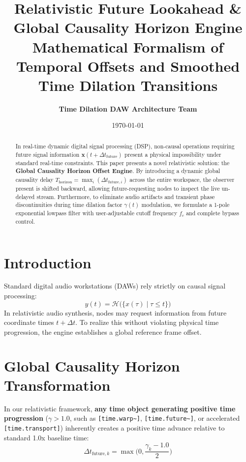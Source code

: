 \documentclass[11pt,a4paper]{article}
\title{\textbf{Relativistic Future Lookahead \& Global Causality Horizon Engine}\\[0.5em]
\large Mathematical Formalism of Temporal Offsets and Smoothed Time Dilation Transitions}
\author{\textbf{Time Dilation DAW Architecture Team}}
\date{\today}
\begin{document}
\maketitle

\begin{abstract}
In real-time dynamic digital signal processing (DSP), non-causal operations requiring future signal information $\mathbf{x}(t + \Delta t_{\text{future}})$ present a physical impossibility under standard real-time constraints. This paper presents a novel relativistic solution: the \textbf{Global Causality Horizon Offset Engine}. By introducing a dynamic global causality delay $T_{\text{horizon}} = \max_i (\Delta t_{\text{future}, i})$ across the entire workspace, the observer present is shifted backward, allowing future-requesting nodes to inspect the live un-delayed stream. Furthermore, to eliminate audio artifacts and transient phase discontinuities during time dilation factor $\gamma(t)$ modulation, we formulate a 1-pole exponential lowpass filter with user-adjustable cutoff frequency $f_c$ and complete bypass control.
\end{abstract}

\section{Introduction}
Standard digital audio workstations (DAWs) rely strictly on causal signal processing:
\begin{equation}
y(t) = \mathcal{H}\Big( \{x(\tau) \mid \tau \le t\} \Big)
\end{equation}
In relativistic audio synthesis, nodes may request information from future coordinate times $t + \Delta t$. To realize this without violating physical time progression, the engine establishes a global reference frame offset.

\section{Global Causality Horizon Transformation}

In our relativistic framework, \textbf{any time object generating positive time progression} ($\gamma > 1.0$, such as \texttt{[time.warp\~{}]}, \texttt{[time.future\~{}]}, or accelerated \texttt{[time.transport]}) inherently creates a positive time advance relative to standard 1.0x baseline time:
\begin{equation}
\Delta t_{\text{future}, k} = \max\Big(0, \frac{\gamma_k - 1.0}{2}\Big)
\end{equation}
\end{document}
